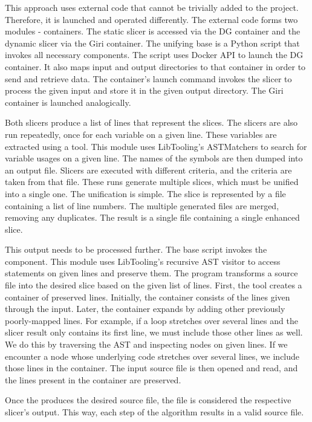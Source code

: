 This approach uses external code that cannot be trivially added to 
the project.
Therefore, it is launched and operated differently.
The external code forms two modules - containers. 
The static slicer is accessed via the DG container and the dynamic slicer 
via the Giri container. 
The unifying base is a Python script that invokes all necessary components.
The script uses Docker API to launch the DG container.
It also maps input and output directories to that container in order to send 
and retrieve data.
The container's launch command invokes the slicer to process the given input 
and store it in the given output directory.
The Giri container is launched analogically.

Both slicers produce a list of lines that represent the slices. 
The slicers are also run repeatedly, once for each variable on a given line. 
These variables are extracted using a  tool. 
This module uses LibTooling's ASTMatchers to search for variable usages on 
a given line. 
The names of the symbols are then dumped into an output file. 
Slicers are executed with different criteria, and the criteria are taken 
from that file.
These runs generate multiple slices, which must be unified into a single one. 
The unification is simple. 
The slice is represented by a file containing a list of line numbers. 
The multiple generated files are merged, removing any duplicates. 
The result is a single file containing a single enhanced slice. 

This output needs to be processed further. 
The base script invokes the  component. 
This module uses LibTooling's recursive AST visitor to access statements on 
given lines and preserve them. 
The program transforms a source file into the desired slice based on 
the given list of lines. 
First, the tool creates a container of preserved lines. 
Initially, the container consists of the lines given through the input. 
Later, the container expands by adding other previously poorly-mapped lines. 
For example, if a  loop stretches over several lines and 
the slicer result only contains its first line, we must include those other 
lines as well. 
We do this by traversing the AST and inspecting nodes on given lines. 
If we encounter a node whose underlying code stretches over several lines, 
we include those lines in the container. 
The input source file is then opened and read, and the lines present in 
the container are preserved. 

Once the  produces the desired source file, the file 
is considered the respective slicer's output.
This way, each step of the algorithm results in a valid source file.

